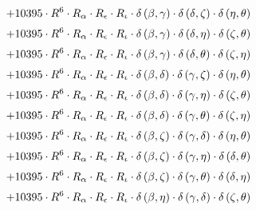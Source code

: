 \begin{subequations}
\begin{gather}
 \\[0.2em] \notag 		 + 10395 \cdot R^{6} \cdot R_{\alpha{}} \cdot R_{\epsilon{}} \cdot R_{\iota{}} \cdot \delta{}\left(\beta{}, \gamma{}\right) \cdot \delta{}\left(\delta{}, \zeta{}\right) \cdot \delta{}\left(\eta{}, \theta{}\right) 
 \\[0.2em] \notag 		 + 10395 \cdot R^{6} \cdot R_{\alpha{}} \cdot R_{\epsilon{}} \cdot R_{\iota{}} \cdot \delta{}\left(\beta{}, \gamma{}\right) \cdot \delta{}\left(\delta{}, \eta{}\right) \cdot \delta{}\left(\zeta{}, \theta{}\right) 
 \\[0.2em] \notag 		 + 10395 \cdot R^{6} \cdot R_{\alpha{}} \cdot R_{\epsilon{}} \cdot R_{\iota{}} \cdot \delta{}\left(\beta{}, \gamma{}\right) \cdot \delta{}\left(\delta{}, \theta{}\right) \cdot \delta{}\left(\zeta{}, \eta{}\right) 
 \\[0.2em] \notag 		 + 10395 \cdot R^{6} \cdot R_{\alpha{}} \cdot R_{\epsilon{}} \cdot R_{\iota{}} \cdot \delta{}\left(\beta{}, \delta{}\right) \cdot \delta{}\left(\gamma{}, \zeta{}\right) \cdot \delta{}\left(\eta{}, \theta{}\right) 
 \\[0.2em] \notag 		 + 10395 \cdot R^{6} \cdot R_{\alpha{}} \cdot R_{\epsilon{}} \cdot R_{\iota{}} \cdot \delta{}\left(\beta{}, \delta{}\right) \cdot \delta{}\left(\gamma{}, \eta{}\right) \cdot \delta{}\left(\zeta{}, \theta{}\right) 
 \\[0.2em] \notag 		 + 10395 \cdot R^{6} \cdot R_{\alpha{}} \cdot R_{\epsilon{}} \cdot R_{\iota{}} \cdot \delta{}\left(\beta{}, \delta{}\right) \cdot \delta{}\left(\gamma{}, \theta{}\right) \cdot \delta{}\left(\zeta{}, \eta{}\right) 
 \\[0.2em] \notag 		 + 10395 \cdot R^{6} \cdot R_{\alpha{}} \cdot R_{\epsilon{}} \cdot R_{\iota{}} \cdot \delta{}\left(\beta{}, \zeta{}\right) \cdot \delta{}\left(\gamma{}, \delta{}\right) \cdot \delta{}\left(\eta{}, \theta{}\right) 
 \\[0.2em] \notag 		 + 10395 \cdot R^{6} \cdot R_{\alpha{}} \cdot R_{\epsilon{}} \cdot R_{\iota{}} \cdot \delta{}\left(\beta{}, \zeta{}\right) \cdot \delta{}\left(\gamma{}, \eta{}\right) \cdot \delta{}\left(\delta{}, \theta{}\right) 
 \\[0.2em] \notag 		 + 10395 \cdot R^{6} \cdot R_{\alpha{}} \cdot R_{\epsilon{}} \cdot R_{\iota{}} \cdot \delta{}\left(\beta{}, \zeta{}\right) \cdot \delta{}\left(\gamma{}, \theta{}\right) \cdot \delta{}\left(\delta{}, \eta{}\right) 
 \\[0.2em] \notag 		 + 10395 \cdot R^{6} \cdot R_{\alpha{}} \cdot R_{\epsilon{}} \cdot R_{\iota{}} \cdot \delta{}\left(\beta{}, \eta{}\right) \cdot \delta{}\left(\gamma{}, \delta{}\right) \cdot \delta{}\left(\zeta{}, \theta{}\right) 

\end{gather}
\end{subequations}
